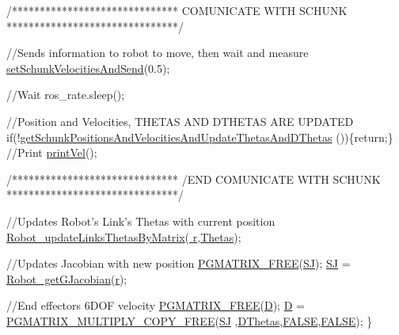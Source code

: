 \begin{DoxyCode}
                \textcolor{comment}{/******************************}
\textcolor{comment}{                        COMUNICATE WITH SCHUNK}
\textcolor{comment}{                *******************************/}

                \textcolor{comment}{//Sends information to robot to move, then wait and measure}
                \hyperlink{classCartesian__controller_a40d17a9794af8a9a607618bf0ee5efff}{setSchunkVelocitiesAndSend}(0.5);

                \textcolor{comment}{//Wait}
                ros\_rate.sleep();

                \textcolor{comment}{//Position and Velocities, THETAS AND DTHETAS ARE UPDATED}
                \textcolor{keywordflow}{if}(!\hyperlink{classCartesian__controller_a0d7a63bac84715f6742db738df246f91}{getSchunkPositionsAndVelocitiesAndUpdateThetasAndDThetas}
      ())\{\textcolor{keywordflow}{return};\}
                \textcolor{comment}{//Print}
                \hyperlink{classCartesian__velocity__controller_ad5dbfc4b8ec4fad7bca9b9a4fd9358b4}{printVel}();

                \textcolor{comment}{/******************************}
\textcolor{comment}{                /END    COMUNICATE WITH SCHUNK}
\textcolor{comment}{                *******************************/}

                \textcolor{comment}{//Updates Robot's Link's Thetas with current position}
                \hyperlink{robot_8h_aa1d3aca5132bd5f347f5966d38fbb966}{Robot\_updateLinksThetasByMatrix}(\hyperlink{classCartesian__controller_a5562129951bd802e4ded77fc716c87a0}{
      r},\hyperlink{classCartesian__controller_a0a0f818dad601cd9e3e26cb6959b8eb6}{Thetas});

                \textcolor{comment}{//Updates Jacobian with new position}
                \hyperlink{gmatrix_8h_a9a73b4e0a77f386c0bae1bba75298d1d}{PGMATRIX\_FREE}(\hyperlink{classCartesian__controller_a98fdac06d136ac3dba0102d97cd5dd36}{SJ});
                \hyperlink{classCartesian__controller_a98fdac06d136ac3dba0102d97cd5dd36}{SJ}  = \hyperlink{robot_8h_a61464c237c56f3db3f79b0350df80ddb}{Robot\_getGJacobian}(\hyperlink{classCartesian__controller_a5562129951bd802e4ded77fc716c87a0}{r});

                \textcolor{comment}{//End effectors 6DOF velocity}
                \hyperlink{gmatrix_8h_a9a73b4e0a77f386c0bae1bba75298d1d}{PGMATRIX\_FREE}(\hyperlink{classCartesian__controller_a8c470b652ce436d8e48f126073fc2593}{D});
                \hyperlink{classCartesian__controller_a8c470b652ce436d8e48f126073fc2593}{D} = \hyperlink{gmatrix__plus_8h_a17b482a0aaa68d1f4c1c30a1a72dacbb}{PGMATRIX\_MULTIPLY\_COPY\_FREE}(\hyperlink{classCartesian__controller_a98fdac06d136ac3dba0102d97cd5dd36}{SJ}
      ,\hyperlink{classCartesian__controller_a5d6419e62e130150edfcbd82b1dadcae}{DThetas},\hyperlink{gmatlabdatafile_8h_aa93f0eb578d23995850d61f7d61c55c1}{FALSE},\hyperlink{gmatlabdatafile_8h_aa93f0eb578d23995850d61f7d61c55c1}{FALSE});
        \}


\end{DoxyCode}
